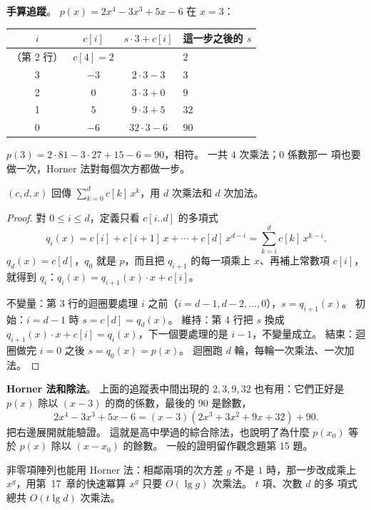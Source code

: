 \textbf{手算追蹤}。 $p(x) = 2x^4 - 3x^3 + 5x - 6$ 在 $x = 3$：

\begin{center}
\begin{tabular}{cccl}
\toprule
$i$ & $c[i]$ & $s \cdot 3 + c[i]$ & 這一步之後的 $s$ \\
\midrule
（第 2 行）& $c[4] = 2$ & & $2$ \\
3 & $-3$ & $2 \cdot 3 - 3$ & $3$ \\
2 & $0$ & $3 \cdot 3 + 0$ & $9$ \\
1 & $5$ & $9 \cdot 3 + 5$ & $32$ \\
0 & $-6$ & $32 \cdot 3 - 6$ & $90$ \\
\bottomrule
\end{tabular}
\end{center}

$p(3) = 2 \cdot 81 - 3 \cdot 27 + 15 - 6 = 90$，相符。 一共 $4$ 次乘法；$0$ 係數那一
項也要做一次，Horner 法對每個次方都做一步。

\begin{theorem}
\label{thm:arr-horner}
$(c, d, x)$ 回傳 $\sum_{k=0}^{d} c[k]\,x^k$，用 $d$ 次乘法和 $d$ 次加法。
\end{theorem}

\begin{proof}
對 $0 \le i \le d$，定義只看 $c[i..d]$ 的多項式
\[
q_i(x) = c[i] + c[i+1]\,x + \cdots + c[d]\,x^{d - i} = \sum_{k=i}^{d} c[k]\,x^{k - i} .
\]
$q_d(x) = c[d]$，$q_0$ 就是 $p$，而且把 $q_{i+1}$ 的每一項乘上 $x$、再補上常數項
$c[i]$，就得到 $q_i$：$q_i(x) = q_{i+1}(x) \cdot x + c[i]$。

不變量：第 3 行的迴圈要處理 $i$ 之前（$i = d - 1, d - 2, \ldots, 0$），$s =
q_{i+1}(x)$。 初始：$i = d - 1$ 時 $s = c[d] = q_d(x)$。 維持：第 4 行把 $s$ 換成
$q_{i+1}(x) \cdot x + c[i] = q_i(x)$，下一個要處理的是 $i - 1$，不變量成立。 結束：迴
圈做完 $i = 0$ 之後 $s = q_0(x) = p(x)$。 迴圈跑 $d$ 輪，每輪一次乘法、一次加法。
\end{proof}

\textbf{Horner 法和除法}。 上面的追蹤表中間出現的 $2, 3, 9, 32$ 也有用：它們正好是
$p(x)$ 除以 $(x - 3)$ 的商的係數，最後的 $90$ 是餘數，
\[
2x^4 - 3x^3 + 5x - 6 = (x - 3)(2x^3 + 3x^2 + 9x + 32) + 90 .
\]
把右邊展開就能驗證。 這就是高中學過的綜合除法，也說明了為什麼 $p(x_0)$ 等於 $p(x)$
除以 $(x - x_0)$ 的餘數。 一般的證明留作觀念題第 15 題。

非零項陣列也能用 Horner 法：相鄰兩項的次方差 $g$ 不是 $1$ 時，那一步改成乘上
$x^{g}$，用第~17~章的快速冪算 $x^g$ 只要 $O(\lg g)$ 次乘法。 $t$ 項、次數 $d$ 的多
項式總共 $O(t \lg d)$ 次乘法。

